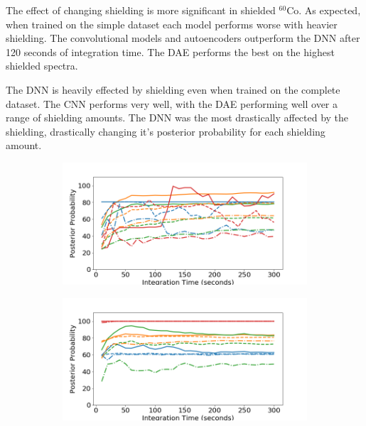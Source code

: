 The effect of changing shielding is more significant in shielded $^{60}$Co. As expected, when trained on the simple dataset each model performs worse with heavier shielding. The convolutional models and autoencoders outperform the DNN after 120 seconds of integration time. The DAE performs the  best on the highest shielded spectra.  

The DNN is heavily effected by shielding even when trained on the complete dataset. The CNN performs very well, with the DAE performing well over a range of shielding amounts. The DNN was the most drastically affected by the shielding, drastically changing it's posterior probability for each shielding amount.

\begin{figure}[H]
     \centering
     \begin{subfigure}[b]{0.49\textwidth}
         \centering
         \includegraphics[width=\textwidth]{images/iron-co60-easy.png}
         \caption{}
         \label{fig:iron-co60-easy}
     \end{subfigure}
     \hfill
     \begin{subfigure}[b]{0.49\textwidth}
         \centering
         \includegraphics[width=\textwidth]{images/iron-co60-full.png}
         \caption{}
         \label{fig:iron-co60-full}

\end{subfigure}
\end{figure}
